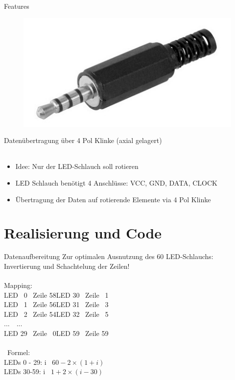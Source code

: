 \begin{frame}{Features}
\begin{figure}
\center
\includegraphics[height=0.25\textheight]{Plots/Klinke2}
\end{figure}
\begin{exampleblock}{}
Datenübertragung über 4 Pol Klinke (axial gelagert)
\\\ \\
\begin{itemize}
\item Idee: Nur der LED-Schlauch soll rotieren
\item LED Schlauch benötigt 4 Anschlüsse: VCC, GND, DATA, CLOCK 
\item Übertragung der Daten auf rotierende Elemente via 4 Pol Klinke
\end{itemize}
\end{exampleblock}
\end{frame}

\section{Realisierung und Code}

\begin{frame}{Datenaufbereitung}
Zur optimalen Ausnutzung des 60 LED-Schlauchs:\\
Invertierung und Schachtelung der Zeilen!\\
\ \\
Mapping:\\
LED \ 0 \rightarrow\ Zeile 58\qquad\qquad\qquad LED 30 \rightarrow\ Zeile \ 1\\
LED \ 1 \rightarrow\ Zeile 56\qquad\qquad\qquad LED 31 \rightarrow\ Zeile \ 3\\
LED \ 2 \rightarrow\ Zeile 54\qquad\qquad\qquad LED 32 \rightarrow\ Zeile \ 5\\
...\qquad\qquad\qquad\qquad\qquad\qquad\ \ ...\\
LED 29 \rightarrow\ Zeile \ 0\qquad\qquad\qquad LED 59 \rightarrow\ Zeile 59\\
\ \\
\Rightarrow\ Formel:\\
LEDs 0 - 29: i \rightarrow\ $60-2\times(1+i)$\\
LEDs 30-59:  i \rightarrow\ $1+2\times(i-30)$
\end{frame}

